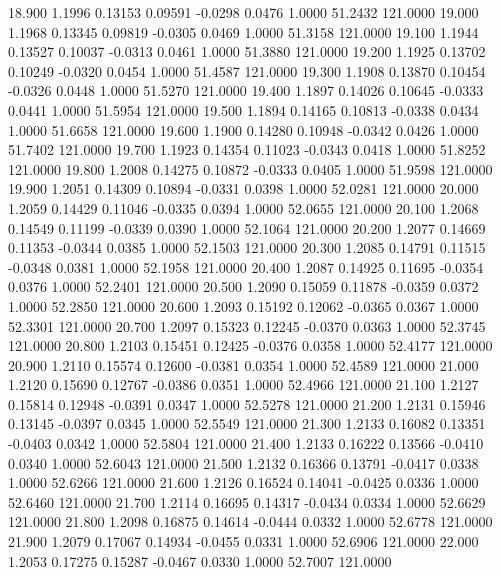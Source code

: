   18.900   1.1996   0.13153   0.09591  -0.0298   0.0476   1.0000  51.2432 121.0000
  19.000   1.1968   0.13345   0.09819  -0.0305   0.0469   1.0000  51.3158 121.0000
  19.100   1.1944   0.13527   0.10037  -0.0313   0.0461   1.0000  51.3880 121.0000
  19.200   1.1925   0.13702   0.10249  -0.0320   0.0454   1.0000  51.4587 121.0000
  19.300   1.1908   0.13870   0.10454  -0.0326   0.0448   1.0000  51.5270 121.0000
  19.400   1.1897   0.14026   0.10645  -0.0333   0.0441   1.0000  51.5954 121.0000
  19.500   1.1894   0.14165   0.10813  -0.0338   0.0434   1.0000  51.6658 121.0000
  19.600   1.1900   0.14280   0.10948  -0.0342   0.0426   1.0000  51.7402 121.0000
  19.700   1.1923   0.14354   0.11023  -0.0343   0.0418   1.0000  51.8252 121.0000
  19.800   1.2008   0.14275   0.10872  -0.0333   0.0405   1.0000  51.9598 121.0000
  19.900   1.2051   0.14309   0.10894  -0.0331   0.0398   1.0000  52.0281 121.0000
  20.000   1.2059   0.14429   0.11046  -0.0335   0.0394   1.0000  52.0655 121.0000
  20.100   1.2068   0.14549   0.11199  -0.0339   0.0390   1.0000  52.1064 121.0000
  20.200   1.2077   0.14669   0.11353  -0.0344   0.0385   1.0000  52.1503 121.0000
  20.300   1.2085   0.14791   0.11515  -0.0348   0.0381   1.0000  52.1958 121.0000
  20.400   1.2087   0.14925   0.11695  -0.0354   0.0376   1.0000  52.2401 121.0000
  20.500   1.2090   0.15059   0.11878  -0.0359   0.0372   1.0000  52.2850 121.0000
  20.600   1.2093   0.15192   0.12062  -0.0365   0.0367   1.0000  52.3301 121.0000
  20.700   1.2097   0.15323   0.12245  -0.0370   0.0363   1.0000  52.3745 121.0000
  20.800   1.2103   0.15451   0.12425  -0.0376   0.0358   1.0000  52.4177 121.0000
  20.900   1.2110   0.15574   0.12600  -0.0381   0.0354   1.0000  52.4589 121.0000
  21.000   1.2120   0.15690   0.12767  -0.0386   0.0351   1.0000  52.4966 121.0000
  21.100   1.2127   0.15814   0.12948  -0.0391   0.0347   1.0000  52.5278 121.0000
  21.200   1.2131   0.15946   0.13145  -0.0397   0.0345   1.0000  52.5549 121.0000
  21.300   1.2133   0.16082   0.13351  -0.0403   0.0342   1.0000  52.5804 121.0000
  21.400   1.2133   0.16222   0.13566  -0.0410   0.0340   1.0000  52.6043 121.0000
  21.500   1.2132   0.16366   0.13791  -0.0417   0.0338   1.0000  52.6266 121.0000
  21.600   1.2126   0.16524   0.14041  -0.0425   0.0336   1.0000  52.6460 121.0000
  21.700   1.2114   0.16695   0.14317  -0.0434   0.0334   1.0000  52.6629 121.0000
  21.800   1.2098   0.16875   0.14614  -0.0444   0.0332   1.0000  52.6778 121.0000
  21.900   1.2079   0.17067   0.14934  -0.0455   0.0331   1.0000  52.6906 121.0000
  22.000   1.2053   0.17275   0.15287  -0.0467   0.0330   1.0000  52.7007 121.0000
